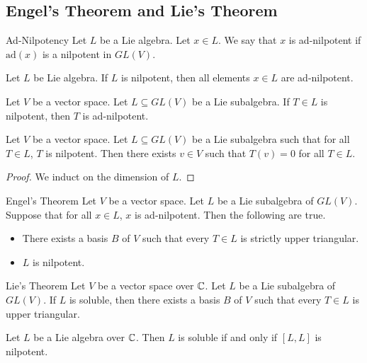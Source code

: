 \documentclass[a4paper]{article}
\begin{document}
\subsection{Engel's Theorem and Lie's Theorem}
\begin{defn}{Ad-Nilpotency}{} Let $L$ be a Lie algebra. Let $x\in L$. We say that $x$ is ad-nilpotent if $\text{ad}(x)$ is a nilpotent in $GL(V)$. 
\end{defn}

\begin{lmm}{}{} Let $L$ be Lie algebra. If $L$ is nilpotent, then all elements $x\in L$ are ad-nilpotent. 
\end{lmm}

\begin{lmm}{}{} Let $V$ be a vector space. Let $L\subseteq GL(V)$ be a Lie subalgebra. If $T\in L$ is nilpotent, then $T$ is ad-nilpotent. 
\end{lmm}

\begin{prp}{}{} Let $V$ be a vector space. Let $L\subseteq GL(V)$ be a Lie subalgebra such that for all $T\in L$, $T$ is nilpotent. Then there exists $v\in V$ such that $T(v)=0$ for all $T\in L$. \tcbline
\begin{proof}
We induct on the dimension of $L$. 
\end{proof}
\end{prp}

\begin{thm}{Engel's Theorem}{} Let $V$ be a vector space. Let $L$ be a Lie subalgebra of $GL(V)$. Suppose that for all $x\in L$, $x$ is ad-nilpotent. Then the following are true. 
\begin{itemize}
\item There exists a basis $B$ of $V$ such that every $T\in L$ is strictly upper triangular. 
\item $L$ is nilpotent. 
\end{itemize}
\end{thm}

\begin{thm}{Lie's Theorem}{} Let $V$ be a vector space over $\mathbb{C}$. Let $L$ be a Lie subalgebra of $GL(V)$. If $L$ is soluble, then there exists a basis $B$ of $V$ such that every $T\in L$ is upper triangular. 
\end{thm}

\begin{crl}{}{} Let $L$ be a Lie algebra over $\mathbb{C}$. Then $L$ is soluble if and only if $[L,L]$ is nilpotent. 
\end{crl}
\end{document}
